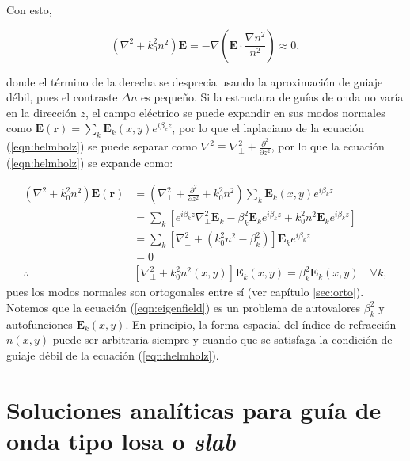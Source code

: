 Con esto, 

\begin{equation}
	(\nabla^2  + k_0^2n^2)\textbf{E} = -\nabla\left(\textbf{E} \cdot \frac{\nabla n^2}{n^2}\right) \approx 0, \label{eqn:helmholz}
\end{equation}

donde el término de la derecha se desprecia usando la aproximación de guiaje débil, pues el contraste $\Delta n$ es pequeño. Si la estructura de guías de onda no varía en la dirección $z$, el campo eléctrico se puede expandir en sus modos normales como $\textbf{E}(\textbf{r}) = \sum_k \textbf{E}_k(x, y) e^{i\beta_k z}$, por lo que el laplaciano de la ecuación (\ref{eqn:helmholz}) se puede separar como $\nabla^2 \equiv \nabla_\perp^2 + \frac{\partial^2}{\partial z^2}$, por lo que la ecuación (\ref{eqn:helmholz}) se expande como:

\begin{align}
	(\nabla^2  + k_0^2n^2) \textbf{E}(\textbf{r}) &= \left(\nabla_\perp^2 + \frac{\partial^2}{\partial z^2} + k_0^2n^2\right)\sum_k \textbf{E}_k(x, y)  e^{i\beta_k z} \nonumber
\\	
	&= \sum_k \left[ e^{i\beta_k z} \nabla_\perp^2 \textbf{E}_k -\beta_k^2\textbf{E}_k e^{i\beta_k z} + k_0^2n^2 \textbf{E}_k  e^{i\beta_k z}\right]
\nonumber	
	\\	
	&= \sum_k \left[  \nabla_\perp^2  + (k_0^2n^2-\beta_k^2) \right]\textbf{E}_k  e^{i\beta_k z}
	\nonumber	
	\\
	&=
	0
	\nonumber
	\\
	\therefore
	& \left[  \nabla_\perp^2  + k_0^2n^2(x,y) \right]\textbf{E}_k(x,y)  = \beta_k^2 \textbf{E}_k(x,y) \quad \forall k, \label{eqn:eigenfield}
\end{align}
pues los modos normales son ortogonales entre sí (ver capítulo \ref{sec:orto}).
Notemos que la ecuación (\ref{eqn:eigenfield}) es un problema de autovalores $\beta_k^2$ y autofunciones $\textbf{E}_k(x,y)$. En principio, la forma espacial del índice de refracción $n(x, y)$ puede ser arbitraria siempre y cuando que se satisfaga la condición de guiaje débil de la ecuación (\ref{eqn:helmholz}). 
 
\section{Soluciones analíticas para guía de onda tipo losa o \textit{slab}}





